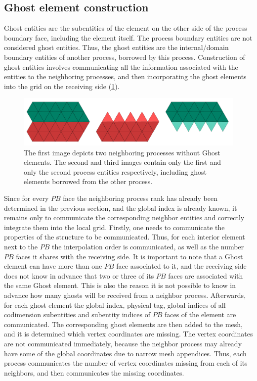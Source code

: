 \subsection{Ghost element construction}
\label{impl-grid-constructor-ghost}

\noindent
Ghost entities are the subentities of the element on the other side of the process boundary face, including the element itself. The process boundary entities are not considered ghost entities. Thus, the ghost entities are the internal/domain boundary entities of another process, borrowed by this process. Construction of ghost entities involves communicating all the information associated with the entities to the neighboring processes, and then incorporating the ghost elements into the grid on the receiving side (\cref{fig:impl:ghostelements}). \\

\begin{figure}
    \centering
	\includegraphics[scale=0.5]{images/parallel-ghost-elements}
	\caption{The first image depicts two neighboring processes without Ghost elements. The second and third images contain only the first and only the second process entities respectively, including ghost elements borrowed from the other process. }
	\label{fig:impl:ghostelements}
\end{figure}

\noindent
Since for every $PB$ face the neighboring process rank has already been determined in the previous section, and the global index is already known, it remains only to communicate the corresponding neighbor entities and correctly integrate them into the local grid. Firstly, one needs to communicate the properties of the structure to be communicated. Thus, for each interior element next to the $PB$ the interpolation order is communicated, as well as the number $PB$ faces it shares with the receiving side. It is important to note that a Ghost element can have more than one $PB$ face associated to it, and the receiving side does not know in advance that two or three of its $PB$ faces are associated with the same Ghost element. This is also the reason it is not possible to know in advance how many ghosts will be received from a neighbor process. Afterwards, for each ghost element the global index, physical tag, global indices of all codimension subentities and subentity indices of $PB$ faces of the element are communicated. The corresponding ghost elements are then added to the mesh, and it is determined which vertex coordinates are missing. The vertex coordinates are not communicated immediately, because the neighbor process may already have some of the global coordinates due to narrow mesh appendices. Thus, each process communicates the number of vertex coordinates missing from each of its neighbors, and then communicates the missing coordinates.




